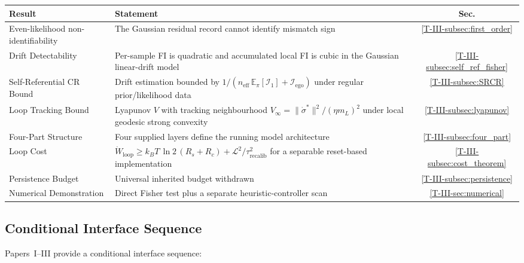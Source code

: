\documentclass[12pt,a4paper,openany]{book}
\begin{document}
\begin{center}
\small
\setlength{\tabcolsep}{4pt}%
\begin{tabular}{@{}lP{6cm}c@{}}
\toprule
\textbf{Result} & \textbf{Statement} & \textbf{Sec.} \\
\midrule
Even-likelihood non-identifiability
  & The Gaussian residual record cannot identify mismatch sign
  & \ref{T-III-subsec:first_order} \\[3pt]
Drift Detectability
  & Per-sample FI is quadratic and accumulated local FI is cubic in the
    Gaussian linear-drift model
  & \ref{T-III-subsec:self_ref_fisher} \\[3pt]
Self-Referential CR Bound
  & Drift estimation bounded by
    $1/(n_{\mathrm{eff}}\,\mathbb E_\pi[\mathcal I_1]
    + \mathcal{I}_{\mathrm{ego}})$ under regular prior/likelihood data
  & \ref{T-III-subsec:SRCR} \\[3pt]
Loop Tracking Bound
  & Lyapunov $V$ with tracking neighbourhood
    $V_\infty = \|\dot{\sigma}^*\|^2/(\eta m_L)^2$ under local
    geodesic strong convexity
  & \ref{T-III-subsec:lyapunov} \\[3pt]
Four-Part Structure
  & Four supplied layers define the running model architecture
  & \ref{T-III-subsec:four_part} \\[3pt]
Loop Cost
  & $\dot{W}_{\mathrm{loop}} \geq k_BT\,\ln 2\,(R_s+R_c)
    + \mathcal{L}^2/\tau_{\mathrm{recalib}}^2$
    for a separable reset-based implementation
  & \ref{T-III-subsec:cost_theorem} \\[3pt]
Persistence Budget
  & Universal inherited budget withdrawn
  & \ref{T-III-subsec:persistence} \\[3pt]
Numerical Demonstration
  & Direct Fisher test plus a separate heuristic-controller scan
  & \ref{T-III-sec:numerical} \\
\bottomrule
\end{tabular}
\end{center}

\subsection{Conditional Interface Sequence}
\label{T-III-subsec:logic_chain}

Papers~I--III provide a conditional interface sequence:
\end{document}
